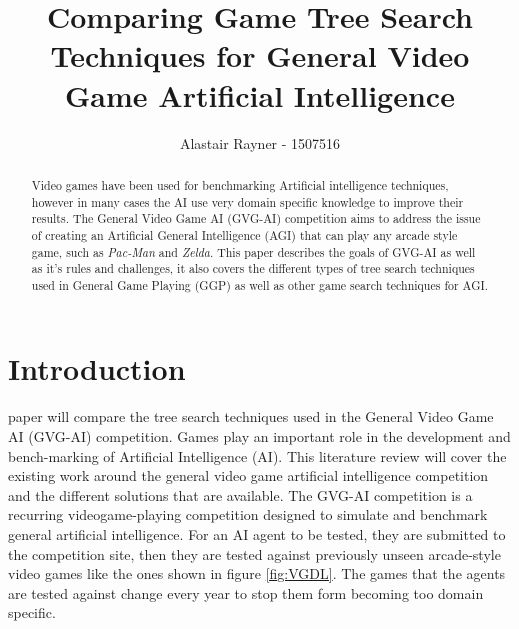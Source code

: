 \documentclass[journal]{IEEEtran}
\begin{document}
%
\title{Comparing Game Tree Search Techniques for General Video Game Artificial Intelligence}
%
%
\author{Alastair Rayner - 1507516}


\maketitle

\begin{abstract}
	Video games have been used for benchmarking Artificial intelligence techniques, however in many cases the AI use very domain specific knowledge to improve their results. 
	The General Video Game AI (GVG-AI) competition aims to address the issue of creating an Artificial General Intelligence (AGI) that can play any arcade style game, such as \textit{Pac-Man} and \textit{Zelda}. This paper describes the goals of GVG-AI as well as it's rules and challenges, it also covers the different types of tree search techniques used in General Game Playing (GGP) as well as other game search techniques for AGI.
	
	
\end{abstract}

\section{Introduction}
 paper will compare the tree search techniques used in the General Video Game AI (GVG-AI) competition. 
Games play an important role in the development and bench-marking of Artificial Intelligence (AI). This literature review will cover the existing work around the general video game artificial intelligence competition and the different solutions that are available.
The GVG-AI competition is a recurring videogame-playing competition designed to simulate and benchmark general artificial intelligence. For an AI agent to be tested, they are submitted to the competition site, then they are tested against previously unseen arcade-style video games like the ones shown in figure \ref{fig:VGDL}. The games that the agents are tested against change every year to stop them form becoming too domain specific.
\end{document}
